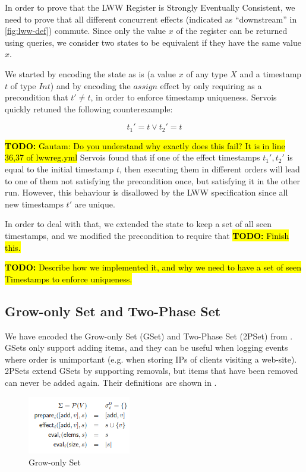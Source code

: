 \documentclass{article}
\newcommand{\TODO}[1]{\hl{\textbf{TODO:} #1}\xspace}
\begin{document}
In order to prove that the LWW Register is Strongly Eventually
Consistent, we need to prove that all different concurrent effects
(indicated as ``downstream'' in \cref{fig:lww-def}) commute. Since
only the value $x$ of the register can be returned using queries, we
consider two states to be equivalent if they have the same value $x$.

We started by encoding the state as is (a value $x$ of any type $X$
and a timestamp $t$ of type $Int$) and by encoding the $assign$ effect
by only requiring as a precondition that $t' \neq t$, in order to
enforce timestamp uniqueness. Servois quickly retuned the following
counterexample:

\[
t_1' = t \vee t_2' = t
\]

\TODO{Gautam: Do you understand why exactly does this fail? It is in
  line 36,37 of lwwreg.yml} Servois found that if one of the effect
timestamps $t_1', t_2'$ is equal to the initial timestamp $t$, then
executing them in different orders will lead to one of them not
satisfying the precondition once, but satisfying it in the other
run. However, this behaviour is disallowed by the LWW specification
since all new timestamps $t'$ are unique.

In order to deal with that, we extended the state to keep a set of all
seen timestamps, and we modified the precondition to require that
\TODO{Finish this.}


\TODO{Describe how we implemented it, and why we need to have a set of seen Timestamps to enforce uniqueness.}

\subsection{Grow-only Set and Two-Phase Set}

We have encoded the Grow-only Set (GSet) and Two-Phase Set (2PSet)
from \cite{baquero2017pure}. GSets only support adding items, and they
can be useful when logging events where order is unimportant
(e.g. when storing IPs of clients visiting a web-site). 2PSets extend
GSets by supporting removals, but items that have been removed can
never be added again. Their definitions are shown in
.

\begin{figure}[h]
    \centering
    \includegraphics[width=0.4\textwidth]{grow-only-set-definition}
    \caption{Grow-only Set}
    \label{fig:gset-def}
\end{figure}
\end{document}
